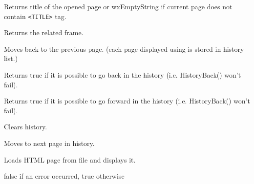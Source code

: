 \label{wxhtmlwindowgetopenedpagetitle}


Returns title of the opened page or wxEmptyString if current page does not contain {\tt <TITLE>} tag.

\label{wxhtmlwindowgetrelatedframe}


Returns the related frame.

\label{wxhtmlwindowhistoryback}


Moves back to the previous page. (each page displayed using 
 is stored in history list.)

\label{wxhtmlwindowhistorycanback}


Returns true if it is possible to go back in the history (i.e. HistoryBack()
won't fail).

\label{wxhtmlwindowhistorycanforward}


Returns true if it is possible to go forward in the history (i.e. HistoryBack()
won't fail).


\label{wxhtmlwindowhistoryclear}


Clears history.

\label{wxhtmlwindowhistoryforward}


Moves to next page in history.

\label{wxhtmlwindowloadfile}


Loads HTML page from file and displays it.


false if an error occurred, true otherwise

